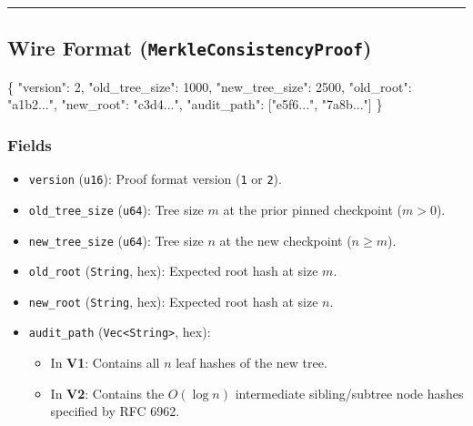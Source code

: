 \documentclass[
]{article}
\newenvironment{Shaded}{}{}
\newcommand{\DataTypeTok}[1]{\textcolor[rgb]{0.56,0.13,0.00}{#1}}
\newcommand{\DecValTok}[1]{\textcolor[rgb]{0.25,0.63,0.44}{#1}}
\newcommand{\FunctionTok}[1]{\textcolor[rgb]{0.02,0.16,0.49}{#1}}
\newcommand{\OtherTok}[1]{\textcolor[rgb]{0.00,0.44,0.13}{#1}}
\newcommand{\StringTok}[1]{\textcolor[rgb]{0.25,0.44,0.63}{#1}}
\providecommand{\tightlist}{%
  \setlength{\itemsep}{0pt}\setlength{\parskip}{0pt}}
\begin{document}
\begin{center}\rule{0.5\linewidth}{0.5pt}\end{center}

\hypertarget{wire-format-merkleconsistencyproof}{%
\subsection{\texorpdfstring{Wire Format
(\texttt{MerkleConsistencyProof})}{Wire Format (MerkleConsistencyProof)}}\label{wire-format-merkleconsistencyproof}}

\begin{Shaded}
\begin{Highlighting}[]
\FunctionTok{\{}
  \DataTypeTok{"version"}\FunctionTok{:} \DecValTok{2}\FunctionTok{,}
  \DataTypeTok{"old\_tree\_size"}\FunctionTok{:} \DecValTok{1000}\FunctionTok{,}
  \DataTypeTok{"new\_tree\_size"}\FunctionTok{:} \DecValTok{2500}\FunctionTok{,}
  \DataTypeTok{"old\_root"}\FunctionTok{:} \StringTok{"a1b2..."}\FunctionTok{,}
  \DataTypeTok{"new\_root"}\FunctionTok{:} \StringTok{"c3d4..."}\FunctionTok{,}
  \DataTypeTok{"audit\_path"}\FunctionTok{:} \OtherTok{[}\StringTok{"e5f6..."}\OtherTok{,} \StringTok{"7a8b..."}\OtherTok{]}
\FunctionTok{\}}
\end{Highlighting}
\end{Shaded}

\hypertarget{fields}{%
\subsubsection{Fields}\label{fields}}

\begin{itemize}
\tightlist
\item
  \texttt{version} (\texttt{u16}): Proof format version (\texttt{1} or
  \texttt{2}).
\item
  \texttt{old\_tree\_size} (\texttt{u64}): Tree size \(m\) at the prior
  pinned checkpoint (\(m > 0\)).
\item
  \texttt{new\_tree\_size} (\texttt{u64}): Tree size \(n\) at the new
  checkpoint (\(n \ge m\)).
\item
  \texttt{old\_root} (\texttt{String}, hex): Expected root hash at size
  \(m\).
\item
  \texttt{new\_root} (\texttt{String}, hex): Expected root hash at size
  \(n\).
\item
  \texttt{audit\_path} (\texttt{Vec\textless{}String\textgreater{}},
  hex):

  \begin{itemize}
  \tightlist
  \item
    In \textbf{V1}: Contains all \(n\) leaf hashes of the new tree.
  \item
    In \textbf{V2}: Contains the \(O(\log n)\) intermediate
    sibling/subtree node hashes specified by RFC 6962.
  \end{itemize}
\end{itemize}
\end{document}
